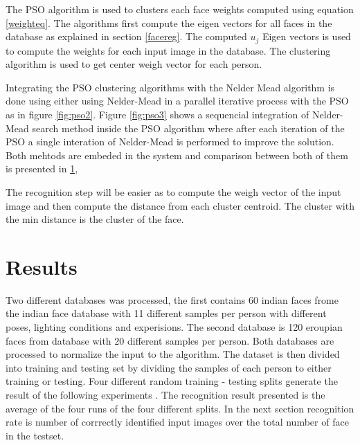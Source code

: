 \documentclass[a4paper,twoside]{article}
\begin{document}
The PSO algorithm is used to clusters each face weights computed using equation \ref{weighteq}. The algorithms first compute the eigen vectors for all faces in the database as explained in section \ref{facereg}. The computed $u_j$ Eigen vectors is used to compute the weights for each input image in the database. The clustering algorithm is used to get center weigh vector for each person. %


Integrating the PSO clustering algorithms with the Nelder Mead algorithm is done using either using Nelder-Mead in a parallel iterative process with the PSO as in figure \ref{fig:pso2}. Figure \ref{fig:pso3} shows a sequencial integration of Nelder-Mead search method inside the PSO algorithm where after each iteration of the PSO a single interation of Nelder-Mead is performed to improve the solution. Both mehtods are embeded in the system and comparison  between both of them is presented in \ref{sec:Results}, %


The recognition step will be easier as to compute the weigh vector of the input image and then compute the distance from each cluster centroid. The cluster with the min distance is the cluster of the face.

\section{Results}
\label{sec:Results}
Two different databases  was processed, the first contains 60 indian faces frome the indian face database \cite{JainMukherjeeIndianFaceDB} with 11 different samples per person  with different poses, lighting conditions and experisions. The second database is 120 eroupian faces from database \cite{} with 20 different samples per person. Both databases are processed to normalize the input to the algorithm. The dataset is then divided into training and testing set by dividing the samples of each person to either training or testing.  Four different  random training - testing splits generate the result of the following experiments . The recognition result presented is the average of the four runs of the four different splits. In the next section recognition rate is number of corrrectly identified input images over the total number of face in the testset. 
 
\end{document}
